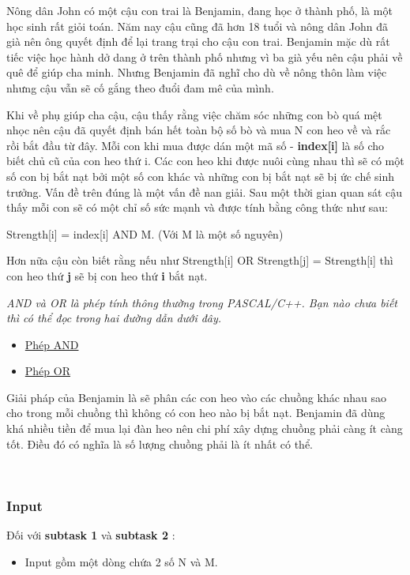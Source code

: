 

Nông dân John có một cậu con trai là Benjamin, đang học ở thành phố, là một học sinh rất giỏi toán. Năm nay cậu cũng đã hơn 18 tuổi và nông dân John đã già nên ông quyết định để lại trang trại cho cậu con trai. Benjamin mặc dù rất tiếc việc học hành dở dang ở trên thành phố nhưng vì ba già yếu nên cậu phải về quê để giúp cha minh. Nhưng Benjamin đã nghĩ cho dù về nông thôn làm việc nhưng cậu vẫn sẽ cố gắng theo đuổi đam mê của mình.

Khi về phụ giúp cha cậu, cậu thấy rằng việc chăm sóc những con bò quá mệt nhọc nên cậu đã quyết định bán hết toàn bộ số bò và mua N con heo về và rắc rồi bắt đầu từ đây. Mỗi con khi mua được dán một mã số - \textbf{ index[i] } là số cho biết chủ cũ của con heo thứ i. Các con heo khi được nuôi cùng nhau thì sẽ có một số con bị bắt nạt bởi một số con khác và những con bị bắt nạt sẽ bị ức chế sinh trưởng. Vấn đề trên đúng là một vấn đề nan giải. Sau một thời gian quan sát cậu thấy mỗi con sẽ có một chỉ số sức mạnh và được tính bằng công thức như sau:

Strength[i] = index[i] AND M. (Với M là một số nguyên)

Hơn nữa cậu còn biết rằng nếu như Strength[i] OR Strength[j] = Strength[i] thì con heo thứ \textbf{ j } sẽ bị con heo thứ \textbf{ i } bắt nạt.

\emph{AND và OR là phép tính thông thường trong PASCAL/C++. Bạn nào chưa biết thì có thể đọc trong hai đường dẫn dưới đây. }
\begin{itemize}
	\item \href{http://vi.wikipedia.org/wiki/Ph%C3%A9p_to%C3%A1n_thao_t%C3%A1c_bit#AND}{Phép AND }
	\item \href{http://vi.wikipedia.org/wiki/Ph%C3%A9p_to%C3%A1n_thao_t%C3%A1c_bit#OR}{Phép OR }
\end{itemize}

Giải pháp của Benjamin là sẽ phân các con heo vào các chuồng khác nhau sao cho trong mỗi chuồng thì không có con heo nào bị bắt nạt. Benjamin đã dùng khá nhiều tiền để mua lại đàn heo nên chi phí xây dựng chuồng phải càng ít càng tốt. Điều đó có nghĩa là số lượng chuồng phải là ít nhất có thể.

 

\subsubsection{Input}

Đối với \textbf{ subtask 1 } và \textbf{ subtask 2 } :
\begin{itemize}
	\item Input gồm một dòng chứa 2 số N và M.
\end{itemize}

